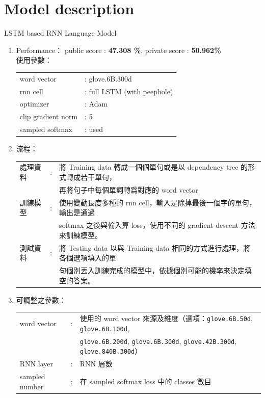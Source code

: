 \documentclass[12pt, a4paper]{article}
\theoremstyle{mystyle}	%
\begin{document}
\section{Model description}
LSTM based RNN Language Model
\begin{enumerate}
  \item Performance：
    public score : \textbf{47.308 \%}, private score : \textbf{50.962\%}\\
  使用參數：\\
  \begin{tabular}{ll}
    word vector     & : glove.6B.300d \\
    rnn cell        & : full LSTM (with peephole) \\
    optimizer       & : Adam  \\
    clip gradient norm & : 5 \\
    sampled softmax & : used \\
  \end{tabular}
  \item 流程：\\
    \begin{tabular}{lcl}
      處理資料 & : & 將 Training data 轉成一個個單句或是以 dependency tree 的形式轉成若干單句，\\
               &   & 再將句子中每個單詞轉爲對應的 word vector \\
      訓練模型 & : & 使用變動長度多種的 rnn cell，輸入是除掉最後一個字的單句，輸出是通過  \\
               &   & softmax 之後與輸入算 loss，使用不同的 gradient descent 方法來訓練模型。\\
      測試資料 & : & 將 Testing data 以與 Training data 相同的方式進行處理，將各個選項填入的單 \\
               &   & 句個別丟入訓練完成的模型中，依據個別可能的機率來決定填空的答案。\\
    \end{tabular}
  \item 可調整之參數：\\
    \begin{tabular}{lcl}
      word vector & : & 使用的 word vector 來源及維度（選項：\texttt{glove.6B.50d}, \texttt{glove.6B.100d}, \\
                &  & \texttt{glove.6B.200d}, \texttt{glove.6B.300d}, \texttt{glove.42B.300d}, \texttt{glove.840B.300d}）\\
      RNN layer & : & RNN 層數 \\
      sampled number & : & 在 sampled softmax loss 中的 classes 數目 \\

\end{tabular}
\end{enumerate}
\end{document}
